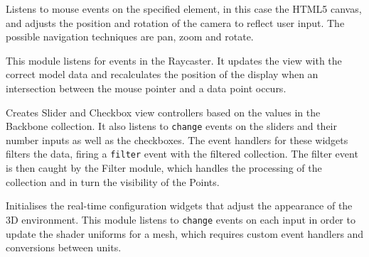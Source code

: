 {\begin{sloppypar}
\begin{description}[leftmargin=0pt]
			\item[Navigation:] Listens to mouse events on the specified element, in this case the HTML5 canvas, and adjusts the position and rotation of the camera to reflect user input. The possible navigation techniques are pan, zoom and rotate.
			\item[Information:] This module listens for events in the Raycaster. It updates the view with the correct model data and recalculates the position of the display when an intersection between the mouse pointer and a data point occurs.
			\item[Filters:] Creates Slider and Checkbox view controllers based on the values in the Backbone collection. It also listens to \texttt{change} events on the sliders and their number inputs as well as the checkboxes. The event handlers for these widgets filters the data, firing a \texttt{filter} event with the filtered collection. The filter event is then caught by the Filter module, which handles the processing of the collection and in turn the visibility of the Points.
			\item[Configurations:] Initialises the real-time configuration widgets that adjust the appearance of the 3D environment. This module listens to \texttt{change} events on each input in order to update the shader uniforms for a mesh, which requires custom event handlers and conversions between units.
		\end{description}
	\end{sloppypar}

}


